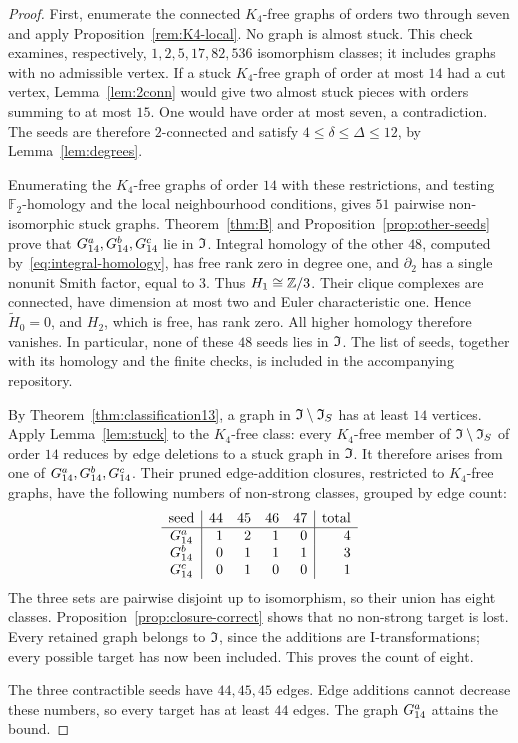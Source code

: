 \begin{proof}
First, enumerate the connected $K_4$-free graphs of orders two through
seven and apply Proposition~\ref{rem:K4-local}. No graph is almost
stuck. This check examines, respectively, $1,2,5,17,82,536$
isomorphism classes; it includes graphs with no admissible vertex.
If a stuck $K_4$-free graph of order at most $14$ had a cut vertex,
Lemma~\ref{lem:2conn} would give two almost stuck pieces with
orders summing to at most $15$. One would have order at most seven,
a contradiction. The seeds are therefore $2$-connected and satisfy
$4\le\delta\le\Delta\le12$, by Lemma~\ref{lem:degrees}.

Enumerating the $K_4$-free graphs of order $14$ with these restrictions,
and testing $\mathbb F_2$-homology and the local neighbourhood conditions, gives
$51$ pairwise non-isomorphic stuck graphs. Theorem~\ref{thm:B}
and Proposition~\ref{prop:other-seeds} prove that $G_{14}^{a},G_{14}^{b},G_{14}^{c}$
lie in $\mathfrak I$. Integral homology of the
other $48$, computed by~\eqref{eq:integral-homology}, has free
rank zero in degree one, and $\partial_2$ has a single nonunit Smith
factor, equal to $3$. Thus $H_1\cong\mathbb Z/3$. Their clique complexes
are connected, have dimension at most two and Euler characteristic
one. Hence $\widetilde H_0=0$, and $H_2$, which is free, has rank
zero. All higher homology therefore vanishes. In particular,
none of these $48$ seeds lies in $\mathfrak I$.
The list of seeds, together with its homology
and the finite checks, is included in the accompanying repository.

By Theorem~\ref{thm:classification13}, a graph in
$\mathfrak I\setminus\mathfrak I_S$ has at least $14$ vertices. Apply
Lemma~\ref{lem:stuck} to the $K_4$-free class: every $K_4$-free
member of $\mathfrak I\setminus\mathfrak I_S$ of order $14$ reduces by edge deletions
to a stuck graph in $\mathfrak I$.
It therefore arises from one of $G_{14}^{a},G_{14}^{b},G_{14}^{c}$. Their pruned
edge-addition closures, restricted to $K_4$-free graphs, have the
following numbers of non-strong classes, grouped by edge count:
\[
\begin{array}{c|rrrr|r}
 \text{seed} & 44 & 45 & 46 & 47 & \text{total}\\ \hline
 G_{14}^{a} & 1 & 2 & 1 & 0 & 4\\
 G_{14}^{b} & 0 & 1 & 1 & 1 & 3\\
 G_{14}^{c} & 0 & 1 & 0 & 0 & 1
\end{array}
\]
The three sets are pairwise disjoint up to isomorphism, so their
union has eight classes. Proposition~\ref{prop:closure-correct}
shows that no non-strong target is lost. Every retained graph belongs
to $\mathfrak I$, since the additions are I-transformations; every possible
target has now been included. This proves the count of eight.

The three contractible seeds have $44,45,45$ edges. Edge additions
cannot decrease these numbers, so every target has at least $44$
edges. The graph $G_{14}^{a}$ attains the bound.
\end{proof}

